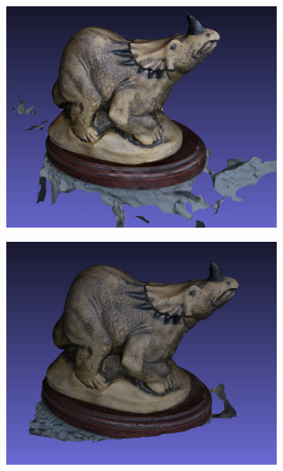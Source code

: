 \begin{figure}[ht]
    \begin{subfigure}{0.45\textwidth}
        \includegraphics[width=\linewidth]{datas/state_of_the_art/openmvg_openmvs_result_dino.png}
        \caption{}
    \end{subfigure}
    \begin{subfigure}{0.45\textwidth}
        \includegraphics[width=\linewidth]{datas/state_of_the_art/meshroom_result_dino.png}
        \caption{}
    \end{subfigure}


\end{figure}
